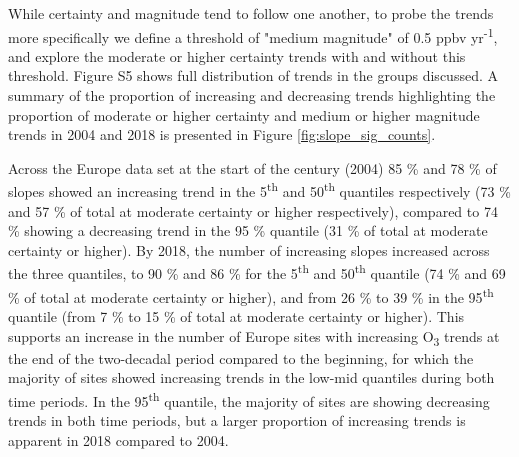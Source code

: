 \documentclass[journal abbreviation, manuscript]{copernicus}
\begin{document}
While certainty and magnitude tend to follow one another, to probe the trends more specifically we define a threshold of "medium magnitude" of 0.5 ppbv yr\textsuperscript{-1}, and explore the moderate or higher certainty trends with and without this threshold. Figure S5 shows full distribution of trends in the groups discussed. A summary of the proportion of increasing and decreasing trends highlighting the proportion of moderate or higher certainty and medium or higher magnitude trends in 2004 and 2018 is presented in Figure \ref{fig:slope_sig_counts}.

Across the Europe data set at the start of the century (2004) 85 \% and 78 \% of slopes showed an increasing trend in the 5\textsuperscript{th} and 50\textsuperscript{th} quantiles respectively (73 \% and 57 \% of total at moderate certainty or higher respectively), compared to 74 \% showing a decreasing trend in the 95 \% quantile (31 \% of total at moderate certainty or higher). By 2018, the number of increasing slopes increased across the three quantiles, to 90 \% and 86 \% for the 5\textsuperscript{th} and 50\textsuperscript{th} quantile (74 \% and 69 \% of total at moderate certainty or higher), and from 26 \% to 39 \% in the 95\textsuperscript{th} quantile (from 7 \% to 15 \% of total at moderate certainty or higher). This supports an increase in the number of Europe sites with increasing O\textsubscript{3} trends at the end of the two-decadal period compared to the beginning, for which the majority of sites showed increasing trends in the low-mid quantiles during both time periods. In the 95\textsuperscript{th} quantile, the majority of sites are showing decreasing trends in both time periods, but a larger proportion of increasing trends is apparent in 2018 compared to 2004. 
\end{document}
